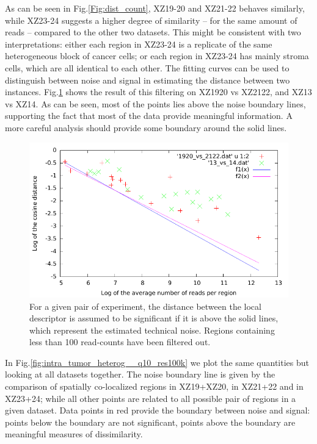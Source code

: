 \documentclass[11pt,a4paper]{article}
\begin{document}
As can be seen in Fig.\ref{Fig:dist_count}, XZ19-20 and XZ21-22 behaves similarly, while XZ23-24 suggests a higher degree of similarity -- for the same amount of reads -- compared to the other two datasets. This might be consistent with two interpretations: either each region in XZ23-24 is a replicate of the same heterogeneous block of cancer cells; or each region in XZ23-24 has mainly stroma cells, which are all identical to each other. The fitting curves can be used to distinguish between noise and signal in estimating the distance between two instances. Fig.\ref{Fig:filter_noise} shows the result of this filtering on XZ1920 vs XZ2122, and XZ13 vs XZ14. As can be seen, most of the points lies above the noise boundary lines, supporting the fact that most of the data provide meaningful information. A more careful analysis should provide some boundary around the solid lines.

\begin{figure}[hbtp]
\centering
\includegraphics[scale=1]{filter_noise.pdf}
\caption{For a given pair of experiment, the distance between the local descriptor is assumed to be significant if it is above the solid lines, which represent the estimated technical noise. Regions containing less than 100 read-counts have been filtered out.}
\label{Fig:filter_noise}
\end{figure}

In Fig.\ref{fig:intra_tumor_heterog__q10_res100k} we plot the same quantities but looking at all datasets together. The noise boundary line is given by the comparison of spatially co-localized regions in XZ19+XZ20, in XZ21+22 and in XZ23+24; while all other points are related to all possible pair of regions in a given dataset. Data points in red provide the boundary between noise and signal: points below the boundary are not significant, points above the boundary are meaningful measures of dissimilarity. 
\end{document}
